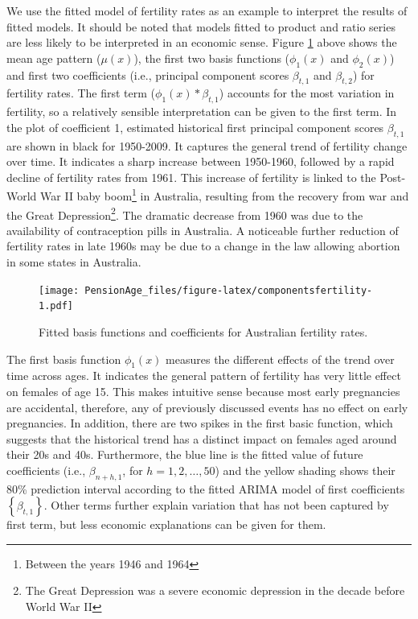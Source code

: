\documentclass[11pt,a4paper,]{article}
\begin{document}
We use the fitted model of fertility rates as an example to interpret
the results of fitted models. It should be noted that models fitted to
product and ratio series are less likely to be interpreted in an
economic sense. Figure \ref{fig:componentsfertility} above shows the
mean age pattern (\(\mu(x)\)), the first two basis functions
(\(\phi_1(x)\) and \(\phi_2(x)\)) and first two coefficients (i.e.,
principal component scores \(\beta_{t,1}\) and \(\beta_{t,2}\)) for
fertility rates. The first term (\(\phi_1(x)*\beta_{t,1}\)) accounts for
the most variation in fertility, so a relatively sensible interpretation
can be given to the first term. In the plot of coefficient 1, estimated
historical first principal component scores \(\beta_{t,1}\) are shown in
black for 1950-2009. It captures the general trend of fertility change
over time. It indicates a sharp increase between 1950-1960, followed by
a rapid decline of fertility rates from 1961. This increase of fertility
is linked to the Post-World War II baby
boom\footnote{Between the years 1946 and 1964} in Australia, resulting
from the recovery from war and the Great
Depression\footnote{The Great Depression was a severe economic depression in the decade before World War II}.
The dramatic decrease from 1960 was due to the availability of
contraception pills in Australia. A noticeable further reduction of
fertility rates in late 1960s may be due to a change in the law allowing
abortion in some states in Australia.

\begin{figure}
\centering
\texttt{[image: PensionAge\_files/figure-latex/componentsfertility-1.pdf]}
\caption{\label{fig:componentsfertility}Fitted basis functions and
coefficients for Australian fertility rates.}
\end{figure}

The first basis function \(\phi_1(x)\) measures the different effects of
the trend over time across ages. It indicates the general pattern of
fertility has very little effect on females of age 15. This makes
intuitive sense because most early pregnancies are accidental,
therefore, any of previously discussed events has no effect on early
pregnancies. In addition, there are two spikes in the first basic
function, which suggests that the historical trend has a distinct impact
on females aged around their 20s and 40s. Furthermore, the blue line is
the fitted value of future coefficients (i.e., \(\beta_{n+h,1}\), for
\(h=1,2,\dots,50\)) and the yellow shading shows their 80\% prediction
interval according to the fitted ARIMA model of first coefficients
\(\left\{\beta_{t,1}\right\}\). Other terms further explain variation
that has not been captured by first term, but less economic explanations
can be given for them.
\end{document}
